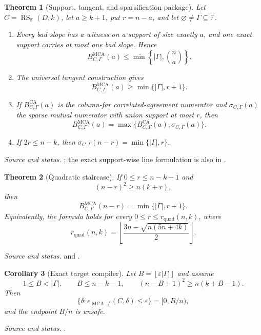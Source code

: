 \documentclass[11pt,a4paper]{amsart}
\numberwithin{equation}{section}
\newtheorem{theorem}{Theorem}[section]
\newtheorem{corollary}[theorem]{Corollary}
\theoremstyle{remark}
\DeclareMathOperator{\RS}{RS}
\DeclareMathOperator{\MCA}{MCA}
\DeclareMathOperator{\CA}{CA}
\newcommand{\F}{\mathbb F}
\newcommand{\eps}{\varepsilon}
\newcommand{\abs}[1]{\lvert#1\rvert}
\newcommand{\floor}[1]{\left\lfloor#1\right\rfloor}
\newcommand{\source}[1]{\par\smallskip\noindent\textit{Source and status.} #1\par}
\begin{document}
\begin{theorem}[Support, tangent, and sparsification package]\label{thm:basic}
Let $C=\RS_{\F}(D,k)$, let $a\ge k+1$, put $r=n-a$, and let $\varnothing\ne\Gamma\subseteq\F$.
\begin{enumerate}[label=\textup{(\roman*)},leftmargin=*]
\item Every bad slope has a witness on a support of size exactly $a$, and one exact support carries at most one bad slope.  Hence
\[
 B_{C,\Gamma}^{\MCA}(a)\le\min\left\{\abs\Gamma,\binom na\right\}.
\]
\item The universal tangent construction gives
\[
 B_{C,\Gamma}^{\MCA}(a)\ge\min\{\abs\Gamma,r+1\}.
\]
\item If $B_{C,\Gamma}^{\CA}(a)$ is the column-far correlated-agreement numerator and $\sigma_{C,\Gamma}(a)$ the sparse mutual numerator with union support at most $r$, then
\[
 B_{C,\Gamma}^{\MCA}(a)=\max\{B_{C,\Gamma}^{\CA}(a),\sigma_{C,\Gamma}(a)\}.
\]
\item If $2r\le n-k$, then $\sigma_{C,\Gamma}(n-r)=\min\{\abs\Gamma,r\}$.
\end{enumerate}
\end{theorem}
\source{\cite{ChoShort26,ChoThresholds26}; the exact support-wise line formulation is also in \cite{LineBridge26}.}

\begin{theorem}[Quadratic staircase]\label{thm:quadratic}
If $0\le r\le n-k-1$ and
\[
 (n-r)^2\ge n(k+r),
\]
then
\[
 \boxed{B_{C,\Gamma}^{\MCA}(n-r)=\min\{\abs\Gamma,r+1\}.}
\]
Equivalently, the formula holds for every $0\le r\le r_{\mathrm{quad}}(n,k)$, where
\[
 r_{\mathrm{quad}}(n,k)=\floor{\frac{3n-\sqrt{n(5n+4k)}}2}.
\]
\end{theorem}
\source{\cite[Quadratic mean-overlap theorem]{ChoShort26} and \cite[Quadratic staircase]{ChoThresholds26}.}

\begin{corollary}[Exact target compiler]\label{cor:target}
Let $B=\floor{\eps\abs\Gamma}$ and assume
\[
 1\le B<\abs\Gamma,
 \qquad B\le n-k-1,
 \qquad (n-B+1)^2\ge n(k+B-1).
\]
Then
\[
 \boxed{\{\delta:e_{\MCA,\Gamma}(C,\delta)\le\eps\}=[0,B/n),}
\]
and the endpoint $B/n$ is unsafe.
\end{corollary}
\source{\cite[Exact target compiler]{ChoShort26,ChoThresholds26}.}
\end{document}
